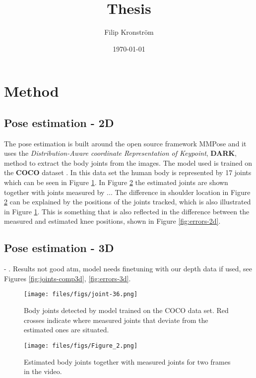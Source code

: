 \documentclass{article}
\title{Thesis}
\author{Filip Kronström}
\date{\today}
\begin{document}
\maketitle
\section{Method}
\subsection{Pose estimation - 2D}
The pose estimation is built around the open source framework MMPose \cite{mmpose} and it uses the \emph{Distribution-Aware coordinate Representation of Keypoint}, \textbf{DARK}, method \cite{Zhang2020} to extract the body joints from the images. The model used is trained on the \textbf{COCO} dataset \cite{Lin2014}. In this data set the human body is represented by 17 joints which can be seen in Figure \ref{fig:COCO-joints}. In Figure \ref{fig:joints-comparison} the estimated joints are shown together with joints measured by ... The difference in shoulder location in Figure \ref{fig:joints-comparison} can be explained by the positions of the joints tracked, which is also illustrated in Figure \ref{fig:COCO-joints}. This is something that is also reflected in the difference between the measured and estimated knee positions, shown in Figure \ref{fig:errors-2d}.

\subsection{Pose estimation - 3D}
- \cite{Pavllo2019}. Results not good atm, model needs finetuning with our depth data if used, see Figures \ref{fig:joints-comp3d}, \ref{fig:errors-3d}.

\begin{figure}
  \centering
  \texttt{[image: files/figs/joint-36.png]}
  \caption{Body joints detected by model trained on the COCO data set. Red crosses indicate where measured joints that deviate from the estimated ones are situated.}
  \label{fig:COCO-joints}
\end{figure}

\begin{figure}
  \centering
  \texttt{[image: files/figs/Figure\_2.png]}
  \caption{Estimated body joints together with measured joints for two frames in the video.}
  \label{fig:joints-comparison}
\end{figure}
\end{document}
